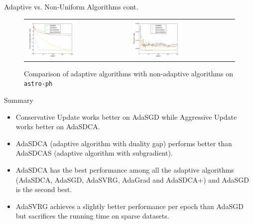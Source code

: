 \begin{frame}{Adaptive vs. Non-Uniform Algorithms cont.}
\begin{figure}[htbp]
\begin{tabular}{ll}
    \centering
        \includegraphics[width=0.5\textwidth]{images/comp_all_obej_astro.pdf} &
        \includegraphics[width=0.5\textwidth]{images/comp_all_terror_astro.pdf}
    \end{tabular}
    \caption{Comparison of adaptive algorithms with non-adaptive algorithms on \texttt{astro-ph}} 
    \label{fig:comp_all2}
\end{figure}
\end{frame}


\begin{frame}{Summary}
\begin{itemize}
	\item Conservative Update works better on AdaSGD  while Aggressive Update works better on AdaSDCA.
	\item AdaSDCA (adaptive algorithm with duality gap) performs better than AdaSDCAS (adaptive algorithm with subgradient).
	\item AdaSDCA has the best performance among all the adaptive algorithms (AdaSDCA, AdaSGD, AdaSVRG, AdaGrad and AdaSDCA+) and AdaSGD is the second best.
	\item AdaSVRG achieves a slightly better performance per epoch than AdaSGD but sacrifices the running time on sparse datasets.
\end{itemize}
\end{frame}


